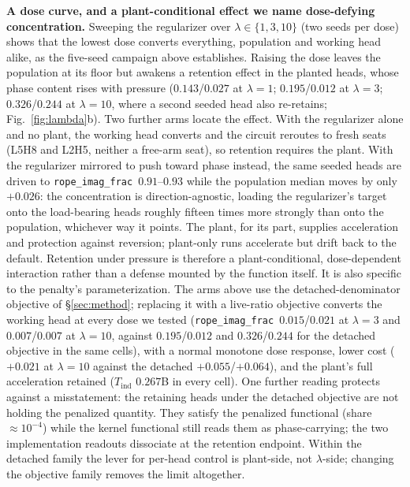 \documentclass[11pt]{article}
\newcommand{\rif}{\texttt{rope\_imag\_frac}\xspace}
\begin{document}
\textbf{A dose curve, and a plant-conditional effect we name dose-defying concentration.} Sweeping the
regularizer over $\lambda\in\{1,3,10\}$ (two seeds per dose) shows that the lowest dose converts everything,
population and working head alike, as the five-seed campaign above establishes. Raising the dose leaves the
population at its floor but awakens a retention effect in the planted heads, whose phase content rises with
pressure ($0.143$/$0.027$ at $\lambda{=}1$; $0.195$/$0.012$ at $\lambda{=}3$; $0.326$/$0.244$ at
$\lambda{=}10$, where a second seeded head also re-retains; Fig.~\ref{fig:lambda}b). Two further arms locate the
effect. With the regularizer alone and no plant, the working head converts and the circuit reroutes to fresh
seats (L5H8 and L2H5, neither a free-arm seat), so retention requires the plant. With the regularizer mirrored to
push toward phase instead, the same seeded heads are driven to \rif\ $0.91$--$0.93$ while the population median
moves by only $+0.026$: the concentration is direction-agnostic, loading the regularizer's target onto the
load-bearing heads roughly fifteen times more strongly than onto the population, whichever way it points. The
plant, for its part, supplies acceleration and protection against reversion; plant-only runs accelerate but drift
back to the default. Retention under pressure is therefore a plant-conditional, dose-dependent interaction rather
than a defense mounted by the function itself. It is also specific to the penalty's parameterization. The arms
above use the detached-denominator objective of \S\ref{sec:method}; replacing it with a live-ratio objective
converts the working head at every dose we tested (\rif\ $0.015$/$0.021$ at $\lambda{=}3$ and $0.007$/$0.007$ at
$\lambda{=}10$, against $0.195$/$0.012$ and $0.326$/$0.244$ for the detached objective in the same cells), with a
normal monotone dose response, lower cost ($+0.021$ at $\lambda{=}10$ against the detached $+0.055$/$+0.064$),
and the plant's full acceleration retained ($T_{\mathrm{ind}}$ $0.267$B in every cell). One further reading
protects against a misstatement: the retaining heads under the detached objective are not holding the penalized
quantity. They satisfy the penalized functional (share ${\approx}10^{-4}$) while the kernel functional still
reads them as phase-carrying; the two implementation readouts dissociate at the retention endpoint. Within the
detached family the lever for per-head control is plant-side, not $\lambda$-side; changing the objective family
removes the limit altogether.
\end{document}
